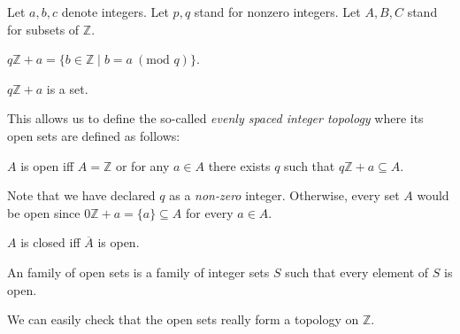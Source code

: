 \documentclass[english]{article}
\renewcommand{\mod}{\text{mod }}
\newcommand{\Int}{\mathbb{Z}}
\begin{document}
  \begin{forthel}
    Let $a,b,c$ denote integers.
    Let $p,q$ stand for nonzero integers.
    Let $A,B,C$ stand for subsets of $\Int$.

    \begin{definition}\label{ArSeq}
      $q \Int + a = \{ b \in \Int \mid b = a ~(\mod q) \}$.
    \end{definition}

    \begin{lemma}
      $q \Int + a$ is a set.
    \end{lemma}
  \end{forthel}

  This allows us to define the so-called \textit{evenly spaced integer topology} where its open sets
  are defined as follows:

  \begin{forthel}
    \begin{definition}\label{Open}
      $A$ is open iff $A = \Int$ or for any $a \in A$ there exists $q$ such that
      $q \Int + a \subseteq A$.
    \end{definition}
  \end{forthel}

  Note that we have declared $q$ as a \textit{non-zero} integer. Otherwise, every set $A$ would be
  open since $0 \Int + a = \{ a \} \subseteq A$ for every $a \in A$.

  \begin{forthel}
    \begin{definition}\label{Closed}
      $A$ is closed iff $\overline{A}$ is open.
    \end{definition}

    \begin{definition}\label{OpenIntegerSets}
      An family of open sets is a family of integer sets $S$ such that every element of $S$ is open.
    \end{definition}
  \end{forthel}

  We can easily check that the open sets really form a topology on $\Int$.
\end{document}
